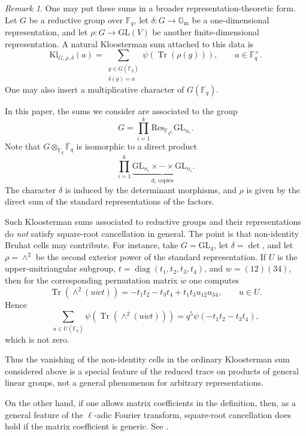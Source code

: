 \documentclass[11pt]{amsart}
\newcommand{\Kl}{\mathrm{Kl}}
\numberwithin{equation}{section}
\theoremstyle{remark}
\newtheorem{remark}[equation]{Remark}
\theoremstyle{plain}
\theoremstyle{definition}
\begin{document}
\begin{remark}
One may put these sums in a broader representation-theoretic form.  Let
\(G\) be a reductive group over \(\mathbb{F}_q\), let
\(\delta\colon G\to\mathbb{G}_{\mathrm{m}}\) be a one-dimensional
representation, and let \(\rho\colon G\to \mathrm{GL}(V)\) be another
finite-dimensional representation.  A natural Kloosterman sum attached
to this data is
\[
\Kl_{G,\rho,\delta}(a)
=
\sum_{\substack{g\in G(\mathbb{F}_q)\\ \delta(g)=a}}
\psi(\operatorname{Tr}(\rho(g))),
\qquad a\in\mathbb{F}_q^\times.
\]
One may also insert a multiplicative character of \(G(\mathbb{F}_q)\).

In this paper, the sums we consider are associated to the group
\begin{equation*}
G = \prod_{i=1}^k \mathrm{Res}_{\mathbb{F}_{q^{d_i}}} \mathrm{GL}_{n_{i}}.
\end{equation*}
Note that \(G\otimes_{\mathbb{F}_q} \overline{\mathbb{F}}_q\)
is isomorphic to a direct product
\begin{equation*}
\prod_{i=1}^k \underbrace{\mathrm{GL}_{n_{i}}\times \cdots \times \mathrm{GL}_{n_i}}_{d_i\text{ copies}}.
\end{equation*}
The character \(\delta\) is induced by the determinant morphisms, and
\(\rho\) is given by the direct sum of the standard representations of
the factors.

Such Kloosterman sums associated to reductive groups and their
representations do \emph{not} satisfy square-root cancellation in
general.  The point is that non-identity Bruhat cells may contribute.
For instance, take \(G=\mathrm{GL}_4\), let \(\delta=\det\), and let
\(\rho=\wedge^2\) be the second exterior power of the standard
representation.  If \(U\) is the upper-unitriangular subgroup,
\(t=\operatorname{diag}(t_1,t_2,t_3,t_4)\), and \(w=(12)(34)\), then
for the corresponding permutation matrix \(\dot w\) one computes
\[
\operatorname{Tr}(\wedge^2(u\dot w t))
=
-t_1t_2-t_3t_4+t_1t_3u_{12}u_{34},
\qquad u\in U.
\]
Hence
\[
\sum_{u\in U(\mathbb{F}_q)}
\psi(\operatorname{Tr}(\wedge^2(u\dot w t)))
=
q^5\psi(-t_1t_2-t_3t_4),
\]
which is not zero.

Thus the vanishing of the non-identity cells in the ordinary
Kloosterman sum considered above is a special feature of the reduced
trace on products of general linear groups, not a general phenomenon
for arbitrary representations.

On the other hand, if one allows matrix coefficients in the definition,
then, as a general feature of the \(\ell\)-adic Fourier transform,
square-root cancellation does hold if the matrix
coefficient is generic.  See \cite{fu-li_hypergeometric-reductive-groups}.
\end{remark}




\end{document}
